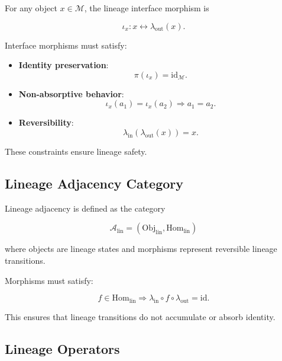 For any object $x \in \mathcal{M}$, the lineage interface morphism is

\[
\iota_x : x \leftrightarrow \lambda_{\mathrm{out}}(x).
\]

Interface morphisms must satisfy:

\begin{itemize}
    \item \textbf{Identity preservation}:
    \[
    \pi(\iota_x) = \mathrm{id}_{\mathcal{M}}.
    \]

    \item \textbf{Non-absorptive behavior}:
    \[
    \iota_x(a_1) = \iota_x(a_2) \Rightarrow a_1 = a_2.
    \]

    \item \textbf{Reversibility}:
    \[
    \lambda_{\mathrm{in}}(\lambda_{\mathrm{out}}(x)) = x.
    \]
\end{itemize}

These constraints ensure lineage safety.


\subsection{Lineage Adjacency Category}

Lineage adjacency is defined as the category

\[
\mathcal{A}_{\mathrm{lin}} = (\mathrm{Obj}_{\mathrm{lin}},
                              \mathrm{Hom}_{\mathrm{lin}})
\]

where objects are lineage states and morphisms represent reversible lineage
transitions.

Morphisms must satisfy:

\[
f \in \mathrm{Hom}_{\mathrm{lin}} \Rightarrow
\lambda_{\mathrm{in}} \circ f \circ \lambda_{\mathrm{out}}
= \mathrm{id}.
\]

This ensures that lineage transitions do not accumulate or absorb identity.


\subsection{Lineage Operators}

